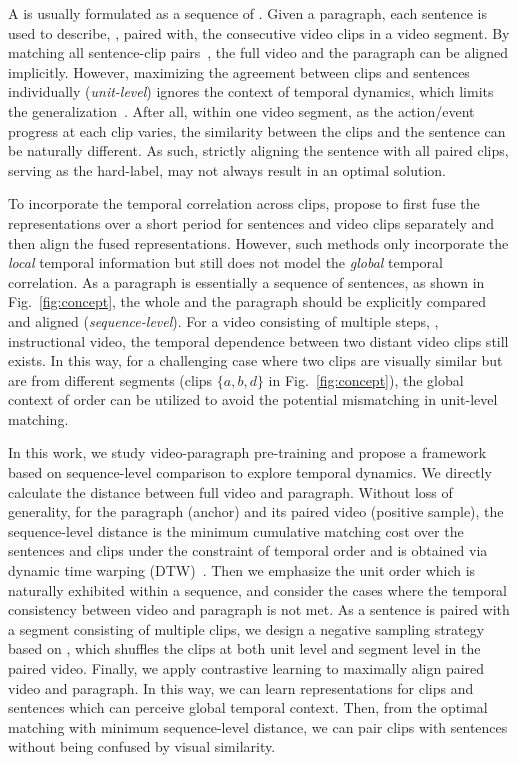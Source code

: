 A \longvideo{} is usually formulated as a sequence of . Given a paragraph, each sentence is used to describe, \ie, paired with, the consecutive video clips in a video segment. 
By matching all sentence-clip pairs~\citep{miech2020end}, the full video and the paragraph can be aligned implicitly.
However, maximizing the agreement between clips and sentences individually (\emph{unit-level}) ignores the context of temporal dynamics, which limits the generalization~\citep{goyal2017something}. 
After all, within one video segment, as the action/event progress at each clip varies, the similarity between the clips and the sentence can be naturally different. 
As such, strictly aligning the sentence with all paired clips, serving as the hard-label, may not always result in an optimal solution. 

To incorporate the temporal correlation across clips, \citet{xu2021videoclip} propose to first fuse the representations over a short period for sentences and video clips separately and then align the fused representations. 
However, such methods only incorporate the \textit{local} temporal information but still does not model the \textit{global} temporal correlation.
As a paragraph is essentially a sequence of sentences, as shown in Fig.~\ref{fig:concept}, the whole \longvideo{} and the paragraph should be explicitly compared and aligned (\emph{sequence-level}).
For a video consisting of multiple steps, \eg, instructional video, the temporal dependence between two distant video clips still exists.
In this way, for a challenging case where two clips are visually similar but are from different segments (clips $\{a,b,d\}$ in Fig.~\ref{fig:concept}), the global context of order can be utilized to avoid the potential mismatching in unit-level matching.

In this work, we study video-paragraph pre-training and propose a framework \approach{} based on sequence-level comparison to explore temporal dynamics.
We directly calculate the distance between full video and paragraph.
Without loss of generality, for the paragraph (anchor) and its paired video (positive sample), the sequence-level distance is the minimum cumulative matching cost over the sentences and clips under the constraint of temporal order and is obtained via dynamic time warping (DTW)~\citep{muller2007dynamic}.
Then we emphasize the unit order which is naturally exhibited within a sequence, and consider the cases where the temporal consistency between video and paragraph is not met.
As a sentence is paired with a segment consisting of multiple clips, we design a negative sampling strategy based on \negkey{}, which shuffles the clips at both unit level and segment level in the paired video. 
Finally, we apply contrastive learning to maximally align paired video and paragraph.
In this way, we can learn representations for clips and sentences which can perceive global temporal context. Then, from the optimal matching with minimum sequence-level distance, we can pair clips with sentences without being confused by visual similarity.

